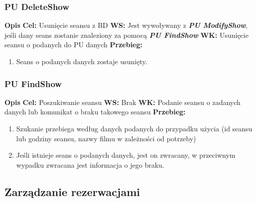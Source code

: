 \documentclass{article}
\begin{document}
	\subsubsection{PU DeleteShow}
	\noindent \textbf{Opis }
	\newline \textbf{Cel:} Usunięcie seansu z BD
	\newline \textbf{WS: } Jest wywoływany z \textit{\textbf{PU ModifyShow}}, jeśli dany seans zostanie znaleziony za pomocą \textit{\textbf{PU FindShow}}
	\newline \textbf{WK: } Usunięcie seansu o podanych do PU danych
	\newline \textbf{Przebieg: }
	\begin{enumerate}
		\item Seans o podanych danych zostaje usunięty.
	\end{enumerate}
	
	\subsubsection{PU FindShow}
	\noindent \textbf{Opis }
	\newline \textbf{Cel: } Poszukiwanie seansu
	\newline \textbf{WS:} Brak
	\newline \textbf{WK: } Podanie seansu o zadanych danych lub komunikat o braku takowego seansu
	\newline \textbf{Przebieg: }
	\begin{enumerate}
		\item Szukanie przebiega według danych podanych do przypadku użycia (id seansu lub godziny seansu, nazwy filmu w zależności od potrzeby)
		\item Jeśli istnieje seans o podanych danych, jest on zwracany, w przeciwnym wypadku zwracana jest informacja o jego braku.
	\end{enumerate}
	
	\subsection{Zarządzanie rezerwacjami}
\end{document}
